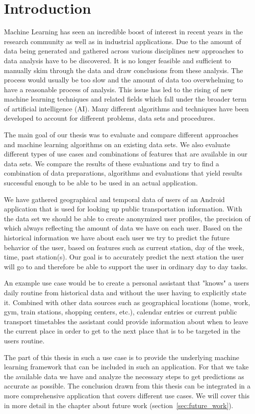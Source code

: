 \newpage
\section{Introduction}
Machine Learning has seen an incredible boost of interest in recent years in the research community as well as in industrial applications. Due to the amount of data being generated and gathered across various disciplines new approaches to data analysis have to be discovered. It is no longer feasible and sufficient to manually skim through the data and draw conclusions from these analysis. The process would usually be too slow and the amount of data too overwhelming to have a reasonable process of analysis. This issue has led to the rising of new machine learning techniques and related fields which fall under the broader term of artificial intelligence (AI). Many different algorithms and techniques have been developed to account for different problems, data sets and procedures.

The main goal of our thesis was to evaluate and compare different approaches and machine learning algorithms on an existing data sets. We also evaluate different types of use cases and combinations of features that are available in our data sets. We compare the results of these evaluations and try to find a combination of data preparations, algorithms and evaluations that yield results successful enough to be able to be used in an actual application. 

We have gathered geographical and temporal data of users of an Android application that is used for looking up public transportation information. With the data set we should be able to create anonymized user profiles, the precision of which always reflecting the amount of data we have on each user. Based on the historical information we have about each user we try to predict the future behavior of the user, based on features such as current station, day of the week, time, past station(s). Our goal is to accurately predict the next station the user will go to and therefore be able to support the user in ordinary day to day tasks. 

An example use case would be to create a personal assistant that "knows" a users daily routine from historical data and without the user having to explicitly state it. Combined with other data sources such as geographical locations (home, work, gym, train stations, shopping centers, etc.), calendar entries or current public transport timetables the assistant could provide information about when to leave the current place in order to get to the next place that is to be targeted in the users routine. 

The part of this thesis in such a use case is to provide the underlying machine learning framework that can be included in such an application. For that we take the available data we have and analyze the necessary steps to get predictions as accurate as possible. The conclusion drawn from this thesis can be integrated in a more comprehensive application that covers different use cases. We will cover this in more detail in the chapter about future work (section~\ref{sec:future_work}).
